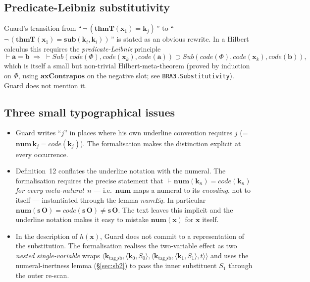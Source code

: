 \documentclass[11pt]{article}
\theoremstyle{plain}
\theoremstyle{definition}
\theoremstyle{remark}
\newcommand{\code}[1]{\mathit{code}(#1)}
\newcommand{\sub}{\mathbf{sub}}
\newcommand{\thmT}{\mathbf{thmT}}
\newcommand{\num}{\mathbf{num}}
\newcommand{\seq}[1]{\langle #1 \rangle}
\newcommand{\Sub}{\mathit{Sub}}
\begin{document}
\subsection{Predicate-Leibniz substitutivity}

Guard's transition from
``\,$\neg\,(\thmT(\mathbf{x}_1) = \mathbf{k}_j)$\,''
to
``\,$\neg\,(\thmT(\mathbf{x}_1) = \sub(\mathbf{k}_i, \mathbf{k}_i))$\,''
is stated as an obvious rewrite.  In a Hilbert calculus this requires
the \emph{predicate-Leibniz} principle
\[
\vdash \mathbf{a} = \mathbf{b} \;\Longrightarrow\; \vdash \Sub(\code{\Phi}, \code{\mathbf{x}_k}, \code{\mathbf{a}}) \supset \Sub(\code{\Phi}, \code{\mathbf{x}_k}, \code{\mathbf{b}}),
\]
which is itself a small but non-trivial Hilbert-meta-theorem (proved by
induction on $\Phi$, using $\mathbf{axContrapos}$ on the negative
slot; see \verb|BRA3.Substitutivity|).  Guard does not mention it.

\subsection{Three small typographical issues}

\begin{itemize}
\item Guard writes ``$j$'' in places where his own underline convention
requires $\underline{j}$ (= $\num\,\mathbf{k}_j = \code{\mathbf{k}_j}$).
The formalisation makes the distinction explicit at every occurrence.

\item Definition~12 conflates the underline notation with the
numeral.  The formalisation requires the precise statement that
$\vdash \num(\mathbf{k}_n) = \code{\mathbf{k}_n}$ \emph{for every
meta-natural~$n$} --- i.e.\ $\num$ maps a numeral to its
\emph{encoding}, not to itself --- instantiated through the lemma
$\mathit{numEq}$.  In particular $\num(\mathbf{s}\,\mathbf{O}) =
\code{\mathbf{s}\,\mathbf{O}} \neq \mathbf{s}\,\mathbf{O}$.  The text
leaves this implicit and the underline notation makes it easy to
mistake $\num(\mathbf{x})$ for $\mathbf{x}$ itself.

\item In the description of $h(\mathbf{x})$, Guard does not commit to a
representation of the substitution.  The formalisation realises the
two-variable effect as two \emph{nested single-variable} wraps
$\seq{\mathbf{k}_{\mathrm{tag\_sb}}, \seq{\mathbf{k}_0, S_0},
\seq{\mathbf{k}_{\mathrm{tag\_sb}}, \seq{\mathbf{k}_1, S_1}, t}}$ and uses
the numeral-inertness lemma ({\S}\ref{sec:sb2}) to pass the inner
substituent $S_1$ through the outer re-scan.
\end{itemize}
\end{document}
